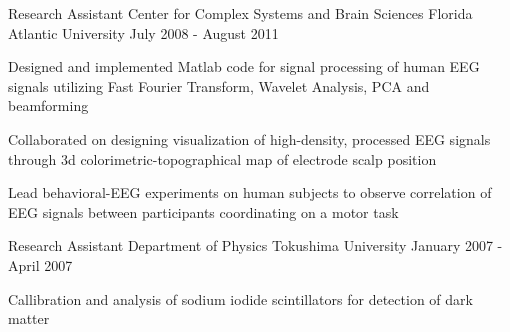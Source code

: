\begin{cventries}
\cventry
{Research Assistant} %
{Center for Complex Systems and Brain Sciences} %
{Florida Atlantic University} %
{July 2008 - August 2011} %
{ %
\begin{cvitems}
\item {Designed and implemented Matlab code for signal processing of human EEG signals utilizing Fast Fourier Transform, Wavelet Analysis, PCA and beamforming}
\item {Collaborated on designing visualization of high-density, processed EEG signals through 3d colorimetric-topographical map of electrode scalp position}
\item {Lead behavioral-EEG experiments on human subjects to observe correlation of EEG signals between participants coordinating on a motor task}
\end{cvitems}
}
\cventry
{Research Assistant} %
{Department of Physics} %
{Tokushima University} %
{January 2007 - April 2007} %
{ %
\begin{cvitems}
\item {Callibration and analysis of sodium iodide scintillators for detection of dark matter}
\end{cvitems}
}




\end{cventries}
